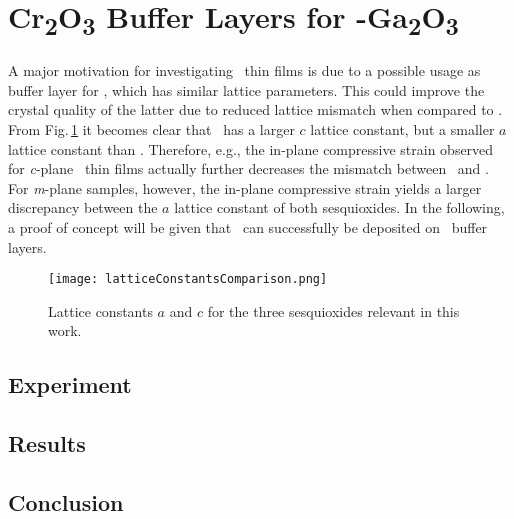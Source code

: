 \section{\texorpdfstring{C\lowercase{r}\textsubscript{2}O\textsubscript{3}}{Cr2O3} Buffer Layers for \texorpdfstring{\textalpha-G\lowercase{a}\textsubscript{2}O\textsubscript{3}}{a-Ga2O3}}
    \label{Sec:Results_Buffer}

A major motivation for investigating \cro\ thin films is due to a possible usage as buffer layer for \agao, which has similar lattice parameters.
This could improve the crystal quality of the latter due to reduced lattice mismatch when compared to 
    \cite{stepanov2021}.
From Fig.\,\ref{Fig:Results_4_LatticeConstantsComp} it becomes clear that \cro\ has a larger $c$ lattice constant, but a smaller $a$ lattice constant than \agao.
Therefore, e.g., the in-plane compressive strain observed for \textit{c}-plane \cro\ thin films actually further decreases the mismatch between \cro\ and \agao.
For \textit{m}-plane samples, however, the in-plane compressive strain yields a larger discrepancy between the $a$ lattice constant of both sesquioxides.
In the following, a proof of concept will be given that \agao\ can successfully be deposited on \cro\ buffer layers.
\begin{figure}[b]
    \centering
    \texttt{[image: latticeConstantsComparison.png]}
    \caption{Lattice constants $a$ and $c$ for the three sesquioxides relevant in this work.}
    \label{Fig:Results_4_LatticeConstantsComp}
\end{figure}

\subsection{Experiment}
    
\subsection{Results}
    
\subsection{Conclusion}
    